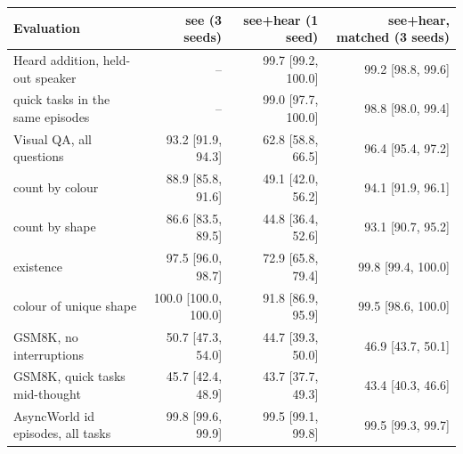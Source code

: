 \begin{tabular}{lrrr}
\toprule
Evaluation & see (3 seeds) & see+hear (1 seed) & see+hear, matched (3 seeds) \\
\midrule
Heard addition, held-out speaker & -- & 99.7 {\scriptsize[99.2, 100.0]} & 99.2 {\scriptsize[98.8, 99.6]} \\
\quad quick tasks in the same episodes & -- & 99.0 {\scriptsize[97.7, 100.0]} & 98.8 {\scriptsize[98.0, 99.4]} \\
Visual QA, all questions & 93.2 {\scriptsize[91.9, 94.3]} & 62.8 {\scriptsize[58.8, 66.5]} & 96.4 {\scriptsize[95.4, 97.2]} \\
\quad count by colour & 88.9 {\scriptsize[85.8, 91.6]} & 49.1 {\scriptsize[42.0, 56.2]} & 94.1 {\scriptsize[91.9, 96.1]} \\
\quad count by shape & 86.6 {\scriptsize[83.5, 89.5]} & 44.8 {\scriptsize[36.4, 52.6]} & 93.1 {\scriptsize[90.7, 95.2]} \\
\quad existence & 97.5 {\scriptsize[96.0, 98.7]} & 72.9 {\scriptsize[65.8, 79.4]} & 99.8 {\scriptsize[99.4, 100.0]} \\
\quad colour of unique shape & 100.0 {\scriptsize[100.0, 100.0]} & 91.8 {\scriptsize[86.9, 95.9]} & 99.5 {\scriptsize[98.6, 100.0]} \\
GSM8K, no interruptions & 50.7 {\scriptsize[47.3, 54.0]} & 44.7 {\scriptsize[39.3, 50.0]} & 46.9 {\scriptsize[43.7, 50.1]} \\
GSM8K, quick tasks mid-thought & 45.7 {\scriptsize[42.4, 48.9]} & 43.7 {\scriptsize[37.7, 49.3]} & 43.4 {\scriptsize[40.3, 46.6]} \\
AsyncWorld id episodes, all tasks & 99.8 {\scriptsize[99.6, 99.9]} & 99.5 {\scriptsize[99.1, 99.8]} & 99.5 {\scriptsize[99.3, 99.7]} \\
\bottomrule
\end{tabular}
